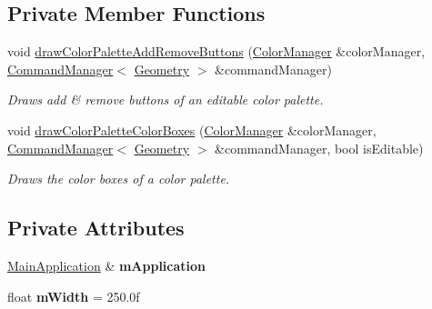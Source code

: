 \subsection*{Private Member Functions}
\begin{DoxyCompactItemize}
\item 
\mbox{\label{classpepr3d_1_1_side_pane_a661999aa5735d68c9ac36fa07722ed5b}} 
void \mbox{\hyperlink{classpepr3d_1_1_side_pane_a661999aa5735d68c9ac36fa07722ed5b}{draw\+Color\+Palette\+Add\+Remove\+Buttons}} (\mbox{\hyperlink{classpepr3d_1_1_color_manager}{Color\+Manager}} \&color\+Manager, \mbox{\hyperlink{classpepr3d_1_1_command_manager}{Command\+Manager}}$<$ \mbox{\hyperlink{classpepr3d_1_1_geometry}{Geometry}} $>$ \&command\+Manager)
\begin{DoxyCompactList}\small\item\em Draws add \& remove buttons of an editable color palette. \end{DoxyCompactList}\item 
\mbox{\label{classpepr3d_1_1_side_pane_a38039d44d10317e493730141b058d193}} 
void \mbox{\hyperlink{classpepr3d_1_1_side_pane_a38039d44d10317e493730141b058d193}{draw\+Color\+Palette\+Color\+Boxes}} (\mbox{\hyperlink{classpepr3d_1_1_color_manager}{Color\+Manager}} \&color\+Manager, \mbox{\hyperlink{classpepr3d_1_1_command_manager}{Command\+Manager}}$<$ \mbox{\hyperlink{classpepr3d_1_1_geometry}{Geometry}} $>$ \&command\+Manager, bool is\+Editable)
\begin{DoxyCompactList}\small\item\em Draws the color boxes of a color palette. \end{DoxyCompactList}\end{DoxyCompactItemize}
\subsection*{Private Attributes}
\begin{DoxyCompactItemize}
\item 
\mbox{\label{classpepr3d_1_1_side_pane_ab3342d437643b373b886c13fadbe2708}} 
\mbox{\hyperlink{classpepr3d_1_1_main_application}{Main\+Application}} \& {\bfseries m\+Application}
\item 
\mbox{\label{classpepr3d_1_1_side_pane_a943018559d65596c1c5822ca50495e8d}} 
float {\bfseries m\+Width} = 250.\+0f
\end{DoxyCompactItemize}


